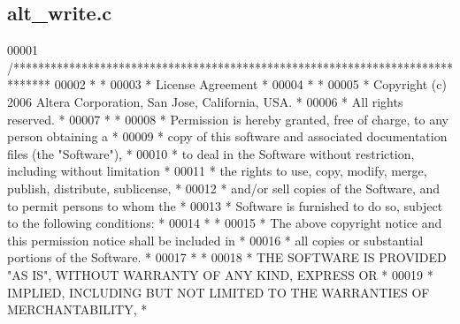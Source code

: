 \subsection{alt\+\_\+write.\+c}
\label{alt__write_8c_source}

\begin{DoxyCode}
00001 \textcolor{comment}{/******************************************************************************}
00002 \textcolor{comment}{*                                                                             *}
00003 \textcolor{comment}{* License Agreement                                                           *}
00004 \textcolor{comment}{*                                                                             *}
00005 \textcolor{comment}{* Copyright (c) 2006 Altera Corporation, San Jose, California, USA.           *}
00006 \textcolor{comment}{* All rights reserved.                                                        *}
00007 \textcolor{comment}{*                                                                             *}
00008 \textcolor{comment}{* Permission is hereby granted, free of charge, to any person obtaining a     *}
00009 \textcolor{comment}{* copy of this software and associated documentation files (the "Software"),  *}
00010 \textcolor{comment}{* to deal in the Software without restriction, including without limitation   *}
00011 \textcolor{comment}{* the rights to use, copy, modify, merge, publish, distribute, sublicense,    *}
00012 \textcolor{comment}{* and/or sell copies of the Software, and to permit persons to whom the       *}
00013 \textcolor{comment}{* Software is furnished to do so, subject to the following conditions:        *}
00014 \textcolor{comment}{*                                                                             *}
00015 \textcolor{comment}{* The above copyright notice and this permission notice shall be included in  *}
00016 \textcolor{comment}{* all copies or substantial portions of the Software.                         *}
00017 \textcolor{comment}{*                                                                             *}
00018 \textcolor{comment}{* THE SOFTWARE IS PROVIDED "AS IS", WITHOUT WARRANTY OF ANY KIND, EXPRESS OR  *}
00019 \textcolor{comment}{* IMPLIED, INCLUDING BUT NOT LIMITED TO THE WARRANTIES OF MERCHANTABILITY,    *}

\end{DoxyCode}
